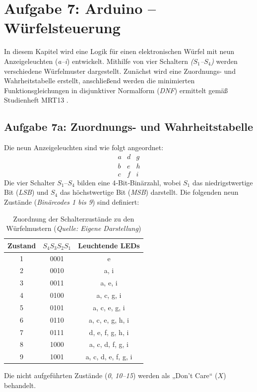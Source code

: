 

\section{Aufgabe 7: Arduino – Würfelsteuerung}
In diesem Kapitel wird eine Logik für einen elektronischen Würfel mit neun Anzeigeleuchten (\textit{a–i}) entwickelt.  
Mithilfe von vier Schaltern \textit{(\(S_1\)–\(S_4\))} werden verschiedene Würfelmuster dargestellt.  
Zunächst wird eine Zuordnungs- und Wahrheitstabelle erstellt, anschließend werden die minimierten Funktionsgleichungen in disjunktiver Normalform (\textit{\acs{DNF}}) ermittelt gemäß Studienheft MRT13 \cite{3}.
\subsection{Aufgabe 7a: Zuordnungs- und Wahrheitstabelle}
Die neun Anzeigeleuchten sind wie folgt angeordnet: \hspace{4cm} \[\begin{matrix}a & d & g \\b & e & h \\c & f & i\end{matrix}\]
Die vier Schalter \(S_1\)–\(S_4\) bilden eine 4‑Bit‑Binärzahl, wobei \(S_1\) das niedrigstwertige Bit (\textit{\acs{LSB}}) und \(S_4\) das höchstwertige Bit (\textit{\acs{MSB}}) darstellt.  
Die folgenden neun Zustände (\textit{Binärcodes 1 bis 9}) sind definiert:
\begin{table}[h]
\centering
\begin{tabular}{c|c|c}
\toprule
\textbf{Zustand} & \(S_4 S_3 S_2 S_1\) & \textbf{Leuchtende \acs{LED}s} \\
\midrule
1 & 0001 & e \\
2 & 0010 & a, i \\
3 & 0011 & a, e, i \\
4 & 0100 & a, c, g, i \\
5 & 0101 & a, c, e, g, i \\
6 & 0110 & a, c, e, g, h, i \\
7 & 0111 & d, e, f, g, h, i \\
8 & 1000 & a, c, d, f, g, i \\
9 & 1001 & a, c, d, e, f, g, i \\
\bottomrule
\end{tabular}
\caption{Zuordnung der Schalterzustände zu den Würfelmustern (\textit{Quelle: Eigene Darstellung})}
\label{tab:wuerfel_muster}
\end{table}
Die nicht aufgeführten Zustände (\textit{0}, \textit{10–15}) werden als „Don’t Care“ (\textit{\(X\)}) behandelt.
